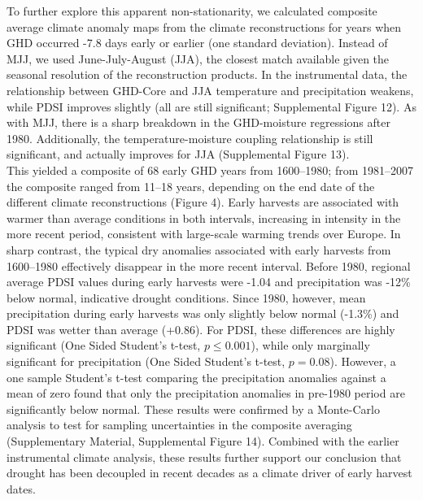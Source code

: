 \documentclass[final]{nature}
\begin{document}
\indent To further explore this apparent non-stationarity, we calculated composite average climate anomaly maps from the climate reconstructions for years when GHD occurred -7.8 days early or earlier (one standard deviation). Instead of MJJ, we used June-July-August (JJA), the closest match available given the seasonal resolution of the reconstruction products. In the instrumental data, the relationship between GHD-Core and JJA temperature and precipitation weakens, while PDSI improves slightly (all are still significant; Supplemental Figure 12). As with MJJ, there is a sharp breakdown in the GHD-moisture regressions after 1980. Additionally, the temperature-moisture coupling relationship is still significant, and actually improves for JJA (Supplemental Figure 13).\\
\indent This yielded a composite of 68 early GHD years from 1600--1980; from 1981--2007 the composite ranged from 11--18 years, depending on the end date of the different climate reconstructions (Figure 4). Early harvests are associated with warmer than average conditions in both intervals, increasing in intensity in the more recent period, consistent with large-scale warming trends over Europe. In sharp contrast, the typical dry anomalies associated with early harvests from 1600--1980 effectively disappear in the more recent interval. Before 1980, regional average PDSI values during early harvests were -1.04 and precipitation was -12\% below normal, indicative drought conditions. Since 1980, however, mean precipitation during early harvests was only slightly below normal (-1.3\%) and PDSI was wetter than average (+0.86). For PDSI, these differences are highly significant (One Sided Student's t-test, $p\le0.001$), while only marginally significant for precipitation (One Sided Student's t-test, $p=0.08$). However, a one sample Student's t-test comparing the precipitation anomalies against a mean of zero found that only the precipitation anomalies in pre-1980 period are significantly below normal. These results were confirmed by a Monte-Carlo analysis to test for sampling uncertainties in the composite averaging (Supplementary Material, Supplemental Figure 14). Combined with the earlier instrumental climate analysis, these results further support our conclusion that drought has been decoupled in recent decades as a climate driver of early harvest dates.\\
\end{document}
